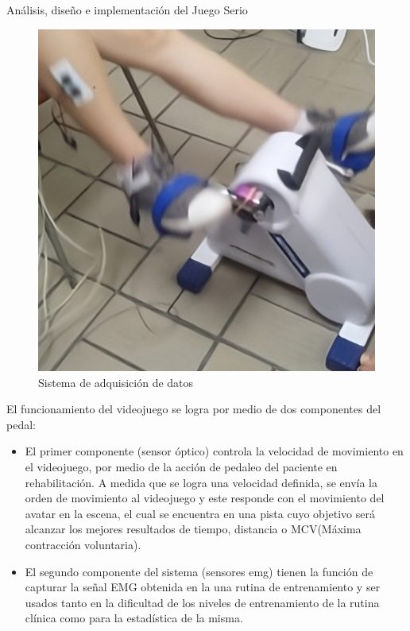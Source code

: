 \begin{thesischapter}{2} {Análisis, diseño e implementación del Juego Serio}
    \begin{figure}[ht]
        \centering
        \includegraphics[scale=0.2]{images/sa.png}
        \caption{Sistema de adquisición de datos}
        \label{fig: sa}
    \end{figure}    

    \vspace{10pt} %
    El funcionamiento del videojuego se logra por medio de dos componentes del pedal:
    \begin{itemize}
        \item El primer componente (sensor óptico) controla la velocidad de movimiento en el videojuego, por
        medio de la acción de pedaleo del paciente en rehabilitación. A medida
        que se logra una velocidad definida, se envía la orden de movimiento al videojuego y 
        este responde con el movimiento del avatar en la escena, el cual se encuentra en una pista 
        cuyo objetivo será alcanzar los mejores resultados de tiempo, distancia o  MCV(Máxima contracción voluntaria).
        \item El segundo componente del sistema (sensores emg) tienen la función de capturar la señal EMG obtenida en la 
        una rutina de entrenamiento y ser usados tanto en la dificultad de los niveles de entrenamiento de la rutina clínica como para la 
        estadística de la misma.
    \end{itemize}
    

\end{thesischapter}
